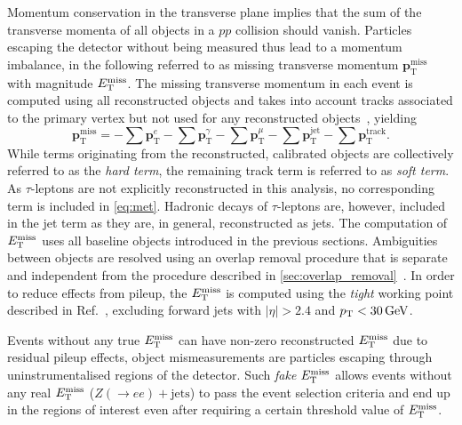 Momentum conservation in the transverse plane implies that the sum of the transverse momenta of all objects in a $pp$ collision should vanish. Particles escaping the detector without being measured thus lead to a momentum imbalance, in the following referred to as missing transverse momentum $\boldsymbol{p}^{\textrm{miss}}_\textrm{T}$ with magnitude $E_{\textrm{T}}^{\textrm{miss}}$. The missing transverse momentum in each event is computed using all reconstructed objects and takes into account tracks associated to the primary vertex but not used for any reconstructed objects~\cite{PERF-2016-07}, yielding
\begin{equation}
	\boldsymbol{p}^{\textrm{miss}}_\textrm{T} = - \sum\boldsymbol{p}^{e}_{\textrm{T}} - \sum\boldsymbol{p}^{\gamma}_{\textrm{T}} - \sum\boldsymbol{p}^{\mu}_{\textrm{T}} - \sum\boldsymbol{p}^{\mathrm{jet}}_{\textrm{T}} - \sum\boldsymbol{p}^{\mathrm{track}}_{\textrm{T}}.
	\label{eq:met}
\end{equation}
While terms originating from the reconstructed, calibrated objects are collectively referred to as the \textit{hard term}, the remaining track term is referred to as \textit{soft term}. As $\tau$-leptons are not explicitly reconstructed in this analysis, no corresponding term is included in \cref{eq:met}. Hadronic decays of $\tau$-leptons are, however, included in the jet term as they are, in general, reconstructed as jets. The computation of $E_{\textrm{T}}^{\textrm{miss}}$ uses all baseline objects introduced in the previous sections. Ambiguities between objects are resolved using an overlap removal procedure that is separate and independent from the procedure described in \cref{sec:overlap_removal}~\cite{PERF-2016-07}. In order to reduce effects from pileup, the $E_{\textrm{T}}^{\textrm{miss}}$ is computed using the \textit{tight} working point described in Ref.~\cite{ATLAS-CONF-2018-023}, excluding forward jets with $\vert\eta\vert > 2.4$ and $\pt < \SI{30}{\GeV}$.

Events without any true $E_{\textrm{T}}^{\textrm{miss}}$ can have non-zero reconstructed $E_{\textrm{T}}^{\textrm{miss}}$ due to residual pileup effects, object mismeasurements are particles escaping through uninstrumentalised regions of the detector. Such \textit{fake} $E_{\textrm{T}}^{\textrm{miss}}$ allows events without any real $E_{\textrm{T}}^{\textrm{miss}}$ (\eg $Z(\rightarrow ee)+\mathrm{jets}$) to pass the event selection criteria and end up in the regions of interest even after requiring a certain threshold value of $E_{\textrm{T}}^{\textrm{miss}}$.


